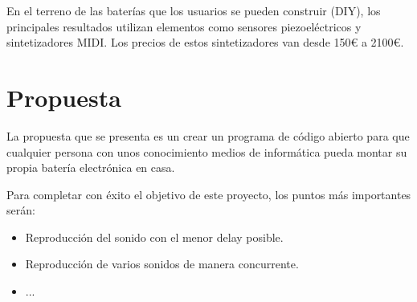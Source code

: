         \newpage

        En el terreno de las baterías que los usuarios se pueden construir (DIY), los principales resultados
        \cite{drum_magazine_diy_kit} utilizan elementos como sensores piezoeléctricos y sintetizadores MIDI. Los precios
        de estos sintetizadores van desde 150\euro{} a 2100\euro{}.


    \section{Propuesta} %
    \label{sec:Propuesta}

        La propuesta que se presenta es un crear un programa de código abierto para que cualquier persona con unos
        conocimiento medios de informática pueda montar su propia batería electrónica en casa.

        Para completar con éxito el objetivo de este proyecto, los puntos más importantes serán:
        \begin{itemize}
            \item Reproducción del sonido con el menor delay posible.
            \item Reproducción de varios sonidos de manera concurrente.
            \item ...
        \end{itemize}



\newpage
